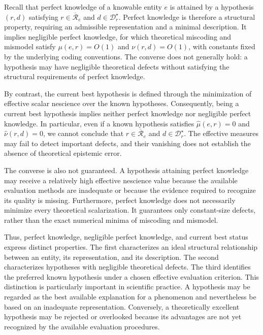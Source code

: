 Recall that perfect knowledge of a knowable entity $e$ is attained by a hypothesis $(r,d)$ satisfying $r\in\overline{\mathcal R}_e$ and $d\in\mathcal D_r^\star$. Perfect knowledge is therefore a structural property, requiring an admissible representation and a minimal description. It implies negligible perfect knowledge, for which theoretical miscoding and mismodel satisfy $\mu(e,r)=O(1)$ and $\nu(r,d)=O(1)$, with constants fixed by the underlying coding conventions. The converse does not generally hold: a hypothesis may have negligible theoretical defects without satisfying the structural requirements of perfect knowledge.

By contrast, the current best hypothesis is defined through the minimization of effective scalar nescience over the known hypotheses. Consequently, being a current best hypothesis implies neither perfect knowledge nor negligible perfect knowledge. In particular, even if a known hypothesis satisfies $\widehat\mu(e,r)=0$ and $ \widehat\nu(r,d)=0$, we cannot conclude that $r\in\overline{\mathcal R}_e$ and $d\in\mathcal D_r^\star$. The effective measures may fail to detect important defects, and their vanishing does not establish the absence of theoretical epistemic error.

The converse is also not guaranteed. A hypothesis attaining perfect knowledge may receive a relatively high effective nescience value because the available evaluation methods are inadequate or because the evidence required to recognize its quality is missing. Furthermore, perfect knowledge does not necessarily minimize every theoretical scalarization. It guarantees only constant-size defects, rather than the exact numerical minima of miscoding and mismodel.

Thus, perfect knowledge, negligible perfect knowledge, and current best status express distinct properties. The first characterizes an ideal structural relationship between an entity, its representation, and its description. The second characterizes hypotheses with negligible theoretical defects. The third identifies the preferred known hypothesis under a chosen effective evaluation criterion. This distinction is particularly important in scientific practice. A hypothesis may be regarded as the best available explanation for a phenomenon and nevertheless be based on an inadequate representation. Conversely, a theoretically excellent hypothesis may be rejected or overlooked because its advantages are not yet recognized by the available evaluation procedures.

